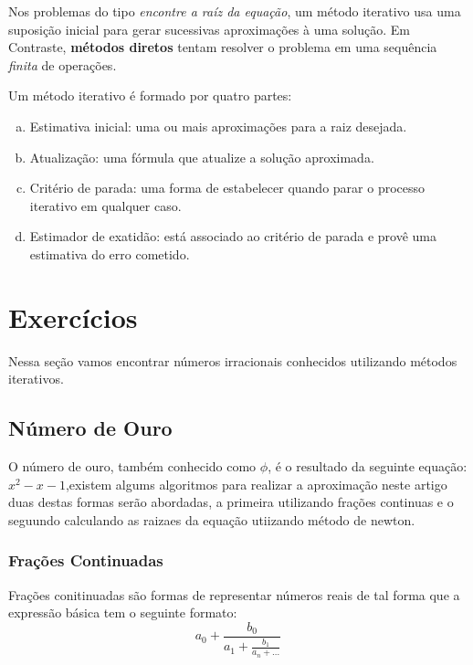 \documentclass[a4paper]{article}
\begin{document}
Nos problemas do tipo \emph{encontre a raíz da equação}, um método iterativo usa uma suposição inicial para gerar sucessivas aproximações à uma solução. Em Contraste, \textbf{métodos diretos} tentam resolver o problema em uma sequência \emph{finita} de operações.

Um método iterativo é formado por quatro partes:~\cite{claudio2000calculo}
\begin{enumerate}[a)]
	\item Estimativa inicial: uma ou mais aproximações para a raiz desejada.
    \item Atualização: uma fórmula que atualize a solução aproximada.
    \item Critério de parada: uma forma de estabelecer quando parar o processo iterativo em qualquer caso.
    \item Estimador de exatidão: está associado ao critério de parada e provê uma estimativa do erro cometido.
\end{enumerate}

\newpage

\section{Exercícios}
Nessa seção vamos encontrar números irracionais conhecidos utilizando métodos iterativos.

\subsection{Número de Ouro}

	O número de ouro, também conhecido como $\phi$, é o resultado da seguinte
	equação: $x^2-x-1$,existem algums algoritmos para realizar a aproximação
	neste artigo duas destas formas serão abordadas, a primeira utilizando
	frações continuas e o seguundo calculando as raizaes da equação utiizando
	método de newton.

\subsubsection{Frações Continuadas}

	Frações conitinuadas são formas de representar números reais de tal forma
	que a expressão básica tem o seguinte formato:
	\begin{equation}\label{eq:phi}
		a_0 + \frac{b_0}{a_1 + \frac{b_1}{a_n + \dots}}
	\end{equation}
\end{document}
